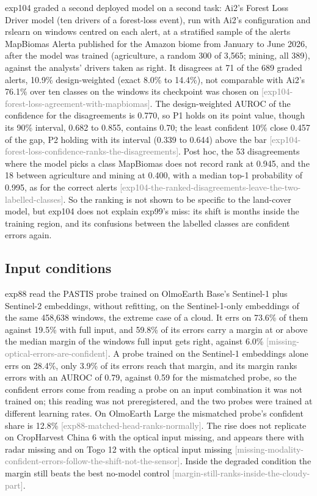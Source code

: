 \documentclass[11pt,a4paper]{article}
\newcommand{\claim}[1]{{\scriptsize\textsf{\textcolor{gray}{[#1]}}}}
\begin{document}
exp104 graded a second deployed model on a second task: Ai2's Forest Loss Driver model (ten drivers of a forest-loss
event), run with Ai2's configuration and rslearn on windows centred on each alert, at a stratified sample of the alerts
MapBiomas Alerta published for the Amazon biome from January to June 2026, after the model was trained (agriculture, a
random 300 of 3,565; mining, all 389), against the analysts' drivers taken as right. It disagrees at 71 of the 689
graded alerts, 10.9\% design-weighted (exact 8.0\% to 14.4\%), not comparable with Ai2's 76.1\% over ten classes on
the windows its checkpoint was chosen on \claim{exp104-forest-loss-agreement-with-mapbiomas}. The design-weighted AUROC
of the confidence for the disagreements is 0.770, so P1 holds on its point value, though its 90\% interval, 0.682 to
0.855, contains 0.70; the least confident 10\% close 0.457 of the gap, P2 holding with its interval (0.339 to 0.644)
above the bar \claim{exp104-forest-loss-confidence-ranks-the-disagreements}. Post hoc, the 53 disagreements where the
model picks a class MapBiomas does not record rank at 0.945, and the 18 between agriculture and mining at 0.400, with a
median top-1 probability of 0.995, as for the correct alerts \claim{exp104-the-ranked-disagreements-leave-the-two-labelled-classes}.
So the ranking is not shown to be specific to the land-cover model, but exp104 does not explain exp99's miss: its shift
is months inside the training region, and its confusions between the labelled classes are confident errors again.

\subsection{Input conditions}
\label{sec:res-conditions}

exp88 read the PASTIS probe trained on OlmoEarth Base's Sentinel-1 plus Sentinel-2 embeddings, without refitting, on
the Sentinel-1-only embeddings of the same 458,638 windows, the extreme case of a cloud. It errs on 73.6\% of them
against 19.5\% with full input, and 59.8\% of its errors carry a margin at or above the median margin of the windows
full input gets right, against 6.0\% \claim{missing-optical-errors-are-confident}. A probe trained on the Sentinel-1
embeddings alone errs on 28.4\%, only 3.9\% of its errors reach that margin, and its margin ranks errors with an AUROC
of 0.79, against 0.59 for the mismatched probe, so the confident errors come from reading a probe on an input
combination it was not trained on; this reading was not preregistered, and the two probes were trained at different
learning rates. On OlmoEarth Large the mismatched probe's confident share is 12.8\% \claim{exp88-matched-head-ranks-normally}. The rise does not replicate on CropHarvest
China 6 with the optical input missing, and appears there with radar missing and on Togo 12 with the optical input
missing \claim{missing-modality-confident-errors-follow-the-shift-not-the-sensor}. Inside the degraded condition the
margin still beats the best no-model control \claim{margin-still-ranks-inside-the-cloudy-part}.
\end{document}
